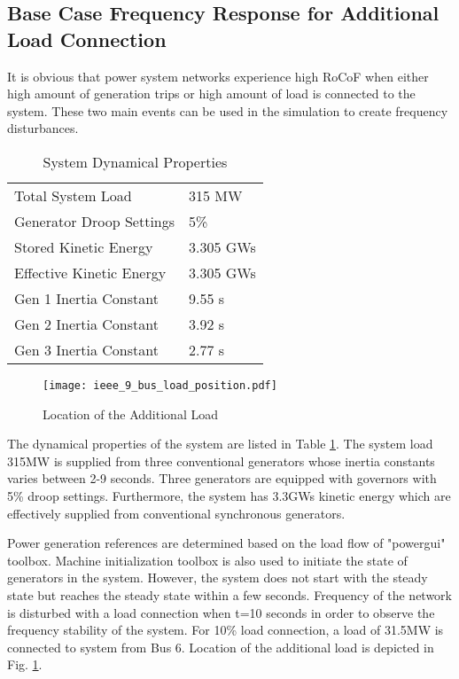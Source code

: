 \subsection{Base Case Frequency Response for Additional Load Connection}
It is obvious that power system networks experience high RoCoF when either high amount of generation trips or high amount of load is connected to the system. These two main events can be used in the simulation to create frequency disturbances.\par
\begin{table}[h]
	\centering
	\begin{tabular}{ll}
		\hline
		Total System Load                      & 315 MW    \\
		Generator Droop Settings               & 5\%       \\
		Stored Kinetic Energy                  & 3.305 GWs \\
		Effective Kinetic Energy               & 3.305 GWs \\
		Gen 1 Inertia Constant                 & 9.55 s  \\
		Gen 2 Inertia Constant                 & 3.92 s  \\
		Gen 3 Inertia Constant                 & 2.77 s  \\ \hline
	\end{tabular}
	\caption{System Dynamical Properties}
	\label{systemdynamicaldata}
\end{table}
\begin{figure}[h!]
	\centering
	\texttt{[image: ieee\_9\_bus\_load\_position.pdf]}
	\caption{Location of the Additional Load}
	\label{ieee_9_bus_load}
\end{figure}
The dynamical properties of the system are listed in Table \ref{systemdynamicaldata}. The system load 315MW is supplied from three conventional generators whose inertia constants varies between 2-9 seconds. Three generators are equipped with governors with 5\% droop settings. Furthermore, the system has 3.3GWs kinetic energy which are effectively supplied from conventional synchronous generators. \par 
Power generation references are determined based on the load flow of "powergui" toolbox. Machine initialization toolbox is also used to initiate the state of generators in the system. However, the system does not start with the steady state but reaches the steady state within a few seconds. Frequency of the network is disturbed with a load connection when t=10 seconds in order to observe the frequency stability of the system. For 10\% load connection, a load of 31.5MW is connected to system from Bus 6. Location of the additional load is depicted in Fig. \ref{ieee_9_bus_load}.\par
